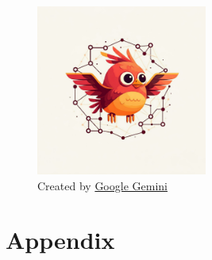 \documentclass[a4paper,12pt]{article}
\begin{document}
\begin{figure}[H]
    \centering
    \includegraphics[width=0.5\textwidth]{ai_image.jpg}
    \caption{Created by \href{https://gemini.google.com/}{Google Gemini}}
    \label{fig:learning_curves}
\end{figure}

\clearpage

\appendix
\section*{Appendix}
\end{document}
